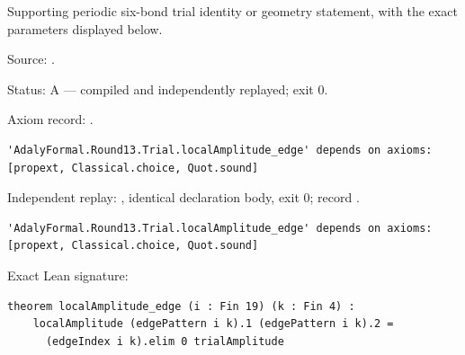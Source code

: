 \begin{theorem}[bp-424]
\label{bp-424}
\leanok
Supporting periodic six-bond trial identity or geometry statement, with the exact parameters displayed below.

\par Source: \texttt{}.
\par Status: A — compiled and independently replayed; exit 0.
\par Axiom record: \texttt{}.
\begin{verbatim}
'AdalyFormal.Round13.Trial.localAmplitude_edge' depends on axioms: [propext, Classical.choice, Quot.sound]
\end{verbatim}
\par Independent replay: \texttt{}, identical declaration body, exit 0; record \texttt{}.
\begin{verbatim}
'AdalyFormal.Round13.Trial.localAmplitude_edge' depends on axioms: [propext, Classical.choice, Quot.sound]
\end{verbatim}
\par Exact Lean signature:
\begin{verbatim}
theorem localAmplitude_edge (i : Fin 19) (k : Fin 4) :
    localAmplitude (edgePattern i k).1 (edgePattern i k).2 =
      (edgeIndex i k).elim 0 trialAmplitude
\end{verbatim}
\end{theorem}

